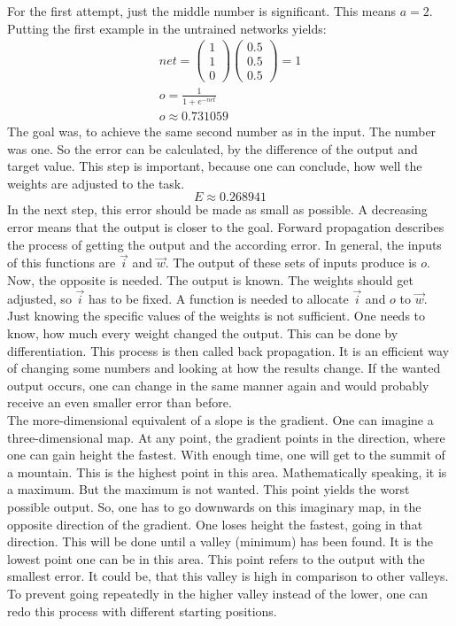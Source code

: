 \documentclass[12pt]{article}
\begin{document}
For the first attempt, just the middle number is significant. This means $a = 2$.  Putting the first example in the untrained networks yields:
\begin{equation}\nonumber
    \begin{gathered}
    net = \begin{pmatrix}1\\ 1\\ 0\end{pmatrix}\begin{pmatrix}0.5\\ 0.5\\ 0.5\end{pmatrix} = 1\\
    o = \frac{1}{1+e^{-net}}\\
    o \approx 0.731059
    \end{gathered}
\end{equation}
The goal was, to achieve the same second number as in the input. The number was one. So the error can be calculated, by the difference of the output and target value. This step is important, because one can conclude, how well the weights are adjusted to the task. 
\begin{equation}\nonumber
    E \approx 0.268941
\end{equation}
In the next step, this error should be made as small as possible. A decreasing error means that the output is closer to the goal. Forward propagation describes the process of getting the output and the according error. In general, the inputs of this functions are $\vec{i}$ and $\vec{w}$. The output of these sets of inputs produce is $o$. Now, the opposite is needed. The output is known. The weights should get adjusted, so $\vec{i}$ has to be fixed. A function is needed to allocate $\vec{i}$ and $o$ to $\vec{w}$. Just knowing the specific values of the weights is not sufficient. One needs to know, how much every weight changed the output. This can be done by differentiation. This process is then called \gls{back propagation}. It is an efficient way of changing some numbers and looking at how the results change. If the wanted output occurs, one can change in the same manner again and would probably receive an even smaller error than before. \\ The more-dimensional equivalent of a slope is the \gls{gradient}. One can imagine a three-dimensional map. At any point, the gradient points in the direction, where one can gain height the fastest. With enough time, one will get to the summit of a mountain. This is the highest point in this area. Mathematically speaking, it is a maximum. But the maximum is not wanted. This point yields the worst possible output. So, one has to go downwards on this imaginary map, in the opposite direction of the gradient. One loses height the fastest, going in that direction. This will be done until a valley (minimum) has been found. It is the lowest point one can be in this area. This point refers to the output with the smallest error. It could be, that this valley is high in comparison to other valleys. To prevent going repeatedly in the higher valley instead of the lower, one can redo this process with different starting positions.
\end{document}
